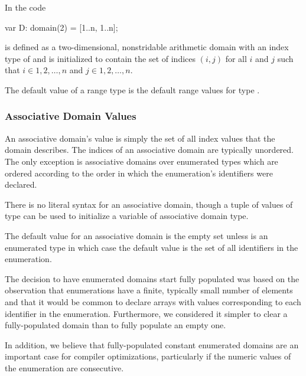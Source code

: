 \begin{example}
In the code
\begin{chapel}
var D: domain(2) = [1..n, 1..n];
\end{chapel}

 is defined as a two-dimensional, nonstridable arithmetic
domain with an index type of  and is initialized to
contain the set of indices $(i,j)$ for all $i$ and $j$ such that
$i \in {1, 2, \ldots, n}$ and $j \in {1, 2, \ldots, n}$.
\end{example}


The default value of a range type is the  default range
values for type  
.


\subsubsection{Associative Domain Values}
\label{Associative_Domain_Values}

An associative domain's value is simply the set of all index values
that the domain describes.  The indices of an associative domain are
typically unordered.  The only exception is associative domains over
enumerated types which are ordered according to the order in which the
enumeration's identifiers were declared.


There is no literal syntax for an associative domain, though a tuple
of values of type  can be used to initialize a variable
of associative domain type.



The default value for an associative domain is the empty set unless
 is an enumerated type in which case the default value
is the set of all identifiers in the enumeration.

\begin{rationale}

The decision to have enumerated domains start fully populated was
based on the observation that enumerations have a finite, typically
small number of elements and that it would be common to declare arrays
with values corresponding to each identifier in the enumeration.
Furthermore, we considered it simpler to clear a fully-populated
domain than to fully populate an empty one.

In addition, we believe that fully-populated constant enumerated
domains are an important case for compiler optimizations, particularly
if the numeric values of the enumeration are consecutive.

\end{rationale}


